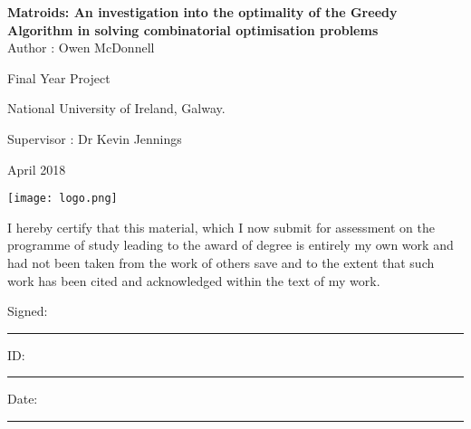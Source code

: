 \documentclass[../main.tex]{subfiles}
\begin{document}
\begin{titlepage}
    \begin{center}
        \vspace*{1cm}
        \vfill
        \textbf {\huge Matroids: An investigation into the optimality of the Greedy Algorithm in solving combinatorial optimisation problems}\\
        
        
        \vspace{15mm}
        \Large Author : Owen McDonnell
        
    
        
        \vspace{0.5cm}
        
        {\Large  Final Year Project}
        \vspace{0.5cm}
        
        National University of Ireland, Galway.
        \vspace{0.5cm}
        
        Supervisor : Dr Kevin Jennings
        
        \vspace{0.5cm}
        
        April 2018
        
        \vfill
        
    
        
        \vspace{0.8cm}
        \texttt{[image: logo.png]}
        
      
    \end{center}
\end{titlepage}
\newpage
\normalsize
\noindent I hereby certify that this material, which I now submit for assessment on the programme of study leading to the award of degree is entirely my own work and had not been taken from the work of others save and to the extent that such work has been cited and acknowledged within the text of my work.
\bigskip

\noindent Signed: \rule{3cm}{0.3pt}    ID: \rule{3cm}{0.3pt}     Date: \rule{3cm}{0.3pt}
\newpage
\end{document}
